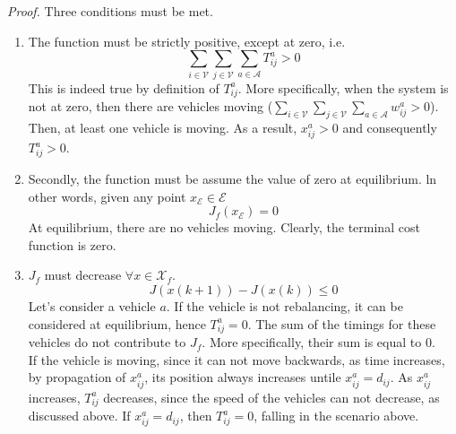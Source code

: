 \textit{Proof. } Three conditions must be met.\\
\begin{enumerate}
	\item The function must be strictly positive, except at zero, i.e.
	\begin{equation*}
		\sum_{i \in \mathcal{V}}\sum_{j \in \mathcal{V}}\sum_{a \in\mathcal{A}}T_{ij}^a >0
	\end{equation*}
	This is indeed true by definition of $T_{ij}^a$. More specifically, when the system is not at zero, then there are vehicles moving ($\sum_{i \in \mathcal{V}}\sum_{j \in \mathcal{V}}\sum_{a \in\mathcal{A}}w_{ij}^a >0$). Then, at least one vehicle is moving. As a result, $x_{ij}^a >0$ and consequently $T_{ij}^a>0$. \\
	\item Secondly, the function must be assume the value of zero at equilibrium. ln other words, given any point $x_{\mathcal{E}}\in\mathcal{E}$
	\begin{equation*}
		J_f(x_{\mathcal{E}}) = 0
	\end{equation*}
	At equilibrium, there are no vehicles moving. Clearly, the terminal cost function is zero. 
	\item $J_f$ must decrease $\forall x \in \mathcal{X}_f$. 
	\begin{equation*}
		J(x(k+1)) - J(x(k))\leq 0
	\end{equation*}
	Let's consider a vehicle $a$. If the vehicle is not rebalancing, it can be considered at equilibrium, hence $T^a_{ij} = 0$. The sum of the timings for these vehicles do not contribute to $J_f$. More specifically, their sum is equal to 0.\\
	If the vehicle is moving, since it can not move backwards, as time increases, by propagation of $x_{ij}^a$, its position always increases untile $x_{ij}^a = d_{ij}$. As $x_{ij}^a$ increases, $T_{ij}^a$ decreases, since the speed of the vehicles can not decrease, as discussed above. If $x_{ij}^a = d_{ij}$, then $T_{ij}^a=0$, falling in the scenario above.

	

\end{enumerate}




